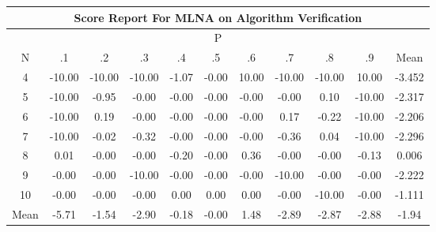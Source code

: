 \documentclass[11pt,a4paper]{report}
\begin{document}
\begin{longtable}{ | c || c | c | c | c | c | c | c | c | c || c |}
\hline
\multicolumn{11}{|c|}{ Score Report For MLNA on Algorithm Verification} \\
\hline
\multicolumn{11}{|c|}{ P } \\
\hline
N & .1 & .2 & .3 & .4 & .5 & .6 & .7 & .8 & .9 & Mean\\
 \hline
 \hline
 \endhead
  4 &  \cellcolor[HTML]{FF0000} -10.00 &  \cellcolor[HTML]{FF0000} -10.00 &  \cellcolor[HTML]{FF0000} -10.00 &  \cellcolor[HTML]{FFE7E7} -1.07 &  \cellcolor[HTML]{FFFFFF} -0.00 &  \cellcolor[HTML]{0808FF} 10.00 &  \cellcolor[HTML]{FF0000} -10.00 &  \cellcolor[HTML]{FF0000} -10.00 &  \cellcolor[HTML]{0808FF} 10.00 & -3.452 \\
  5 &  \cellcolor[HTML]{FF0000} -10.00 &  \cellcolor[HTML]{FFE7E7} -0.95 &  \cellcolor[HTML]{FFFFFF} -0.00 &  \cellcolor[HTML]{FFFFFF} -0.00 &  \cellcolor[HTML]{FFFFFF} -0.00 &  \cellcolor[HTML]{FFFFFF} -0.00 &  \cellcolor[HTML]{FFFFFF} -0.00 &  \cellcolor[HTML]{FFFFFF} 0.10 &  \cellcolor[HTML]{FF0000} -10.00 & -2.317 \\
  6 &  \cellcolor[HTML]{FF0000} -10.00 &  \cellcolor[HTML]{F7F7FF} 0.19 &  \cellcolor[HTML]{FFFFFF} -0.00 &  \cellcolor[HTML]{FFFFFF} -0.00 &  \cellcolor[HTML]{FFFFFF} -0.00 &  \cellcolor[HTML]{FFFFFF} -0.00 &  \cellcolor[HTML]{F7F7FF} 0.17 &  \cellcolor[HTML]{FFF7F7} -0.22 &  \cellcolor[HTML]{FF0000} -10.00 & -2.206 \\
  7 &  \cellcolor[HTML]{FF0000} -10.00 &  \cellcolor[HTML]{FFFFFF} -0.02 &  \cellcolor[HTML]{FFF7F7} -0.32 &  \cellcolor[HTML]{FFFFFF} -0.00 &  \cellcolor[HTML]{FFFFFF} -0.00 &  \cellcolor[HTML]{FFFFFF} -0.00 &  \cellcolor[HTML]{FFF7F7} -0.36 &  \cellcolor[HTML]{FFFFFF} 0.04 &  \cellcolor[HTML]{FF0000} -10.00 & -2.296 \\
  8 &  \cellcolor[HTML]{FFFFFF} 0.01 &  \cellcolor[HTML]{FFFFFF} -0.00 &  \cellcolor[HTML]{FFFFFF} -0.00 &  \cellcolor[HTML]{FFF7F7} -0.20 &  \cellcolor[HTML]{FFFFFF} -0.00 &  \cellcolor[HTML]{F7F7FF} 0.36 &  \cellcolor[HTML]{FFFFFF} -0.00 &  \cellcolor[HTML]{FFFFFF} -0.00 &  \cellcolor[HTML]{FFFFFF} -0.13 & 0.006 \\
  9 &  \cellcolor[HTML]{FFFFFF} -0.00 &  \cellcolor[HTML]{FFFFFF} -0.00 &  \cellcolor[HTML]{FF0000} -10.00 &  \cellcolor[HTML]{FFFFFF} -0.00 &  \cellcolor[HTML]{FFFFFF} -0.00 &  \cellcolor[HTML]{FFFFFF} -0.00 &  \cellcolor[HTML]{FF0000} -10.00 &  \cellcolor[HTML]{FFFFFF} -0.00 &  \cellcolor[HTML]{FFFFFF} -0.00 & -2.222 \\
  10 &  \cellcolor[HTML]{FFFFFF} -0.00 &  \cellcolor[HTML]{FFFFFF} -0.00 &  \cellcolor[HTML]{FFFFFF} -0.00 &  \cellcolor[HTML]{FFFFFF} 0.00 &  \cellcolor[HTML]{FFFFFF} 0.00 &  \cellcolor[HTML]{FFFFFF} 0.00 &  \cellcolor[HTML]{FFFFFF} -0.00 &  \cellcolor[HTML]{FF0000} -10.00 &  \cellcolor[HTML]{FFFFFF} -0.00 & -1.111 \\
 \hline
 \hline
Mean &  \cellcolor[HTML]{FF7070} -5.71 &  \cellcolor[HTML]{FFD7D7} -1.54 &  \cellcolor[HTML]{FFB7B7} -2.90 &  \cellcolor[HTML]{FFF7F7} -0.18 &  \cellcolor[HTML]{FFFFFF} -0.00 &  \cellcolor[HTML]{D7D7FF} 1.48 &  \cellcolor[HTML]{FFB7B7} -2.89 &  \cellcolor[HTML]{FFB7B7} -2.87 &  \cellcolor[HTML]{FFB7B7} -2.88 &  \cellcolor[HTML]{FFCFCF} -1.94
\end{longtable}
\end{document}
